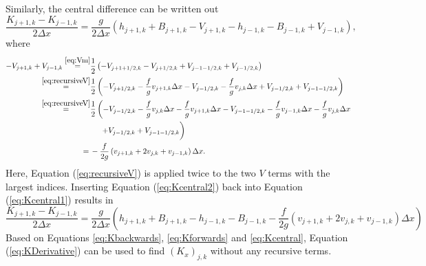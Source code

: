 \documentclass[11pt, a4paper]{article}
\newcommand{\dx}[0]{\Delta x}
\newcommand{\eref}[1]{Equation (\ref{eq:#1})}
\begin{document}
Similarly, the central difference can be written out
\begin{equation}
	\frac{K_{j+1,k} - K_{j-1,k}}{2\dx}  = \frac{g}{2\dx} \left( h_{j+1,k} + B_{j+1,k} - V_{j+1,k} - h_{j-1,k} - B_{j-1,k} + V_{j-1,k} \right),
	\label{eq:Kcentral1}
\end{equation}
where
\begin{equation}
	\begin{split}
		- V_{j+1,k} + V_{j-1,k} 
		\overset{\eqref{eq:Vm}}{=}& \frac{1}{2}\left(-V_{j+1+1/2,k} - V_{j+1/2, k} + V_{j- 1 -1/2, k} + V_{j-1/2, k}  \right)\\
		\overset{\eqref{eq:recursiveV}}{=}& \frac{1}{2} \left( - V_{j+1/2,k} - \frac{f}{g}v_{j+1,k}\dx - V_{j-1/2, k} - \frac{f}{g}v_{j,k}\dx + V_{j-1/2, k} + V_{j- 1 -1/2, k} \right) \\
		\overset{\eqref{eq:recursiveV}}{=}& \frac{1}{2} \left( - V_{j-1/2,k} - \frac{f}{g}v_{j,k}\dx - \frac{f}{g}v_{j+1,k}\dx - V_{j-1-1/2, k} - \frac{f}{g}v_{j-1,k}\dx - \frac{f}{g}v_{j,k}\dx \right.  \\
			& \;\quad\left. + V_{j-1/2, k} + V_{j- 1 -1/2, k} \vphantom{\frac{f}{g}} \right) \\
		=\,&  - \frac{f}{2g} \left(v_{j+1,k} + 2 v_{j,k} + v_{j-1,k} \right) \dx.
	\end{split}
	\label{eq:Kcentral2}
\end{equation}
Here, \eref{recursiveV} is applied twice to the two $V$ terms with the largest indices.
Inserting \eref{Kcentral2} back into \eref{Kcentral1} results in 
\begin{equation}
	\frac{K_{j+1,k} - K_{j-1,k}}{2\dx} = \frac{g}{2\dx} \left( h_{j+1,k} + B_{j+1,k} - h_{j-1,k} - B_{j-1,k}  -\frac{f}{2g} \left(v_{j+1,k} + 2 v_{j,k} + v_{j-1,k} \right) \dx \right)
	\label{eq:Kcentral}
\end{equation}
Based on Equations \eqref{eq:Kbackwards}, \eqref{eq:Kforwards} and \eqref{eq:Kcentral}, \eref{KDerivative} can be used to find $(K_x)_{j,k}$ without any recursive terms.
\end{document}
